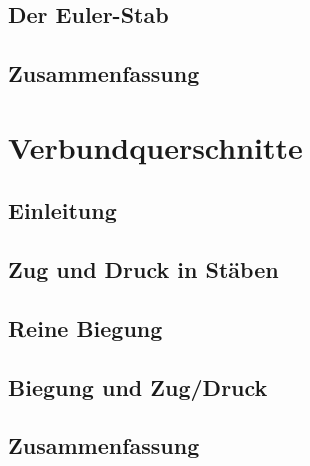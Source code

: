 \documentclass[11pt]{article}
\newcommand{\1}{ {\mathds{1}} }
\begin{document}
		\subsection{Der Euler-Stab}
		\subsection{Zusammenfassung}
	
		\section{Verbundquerschnitte}
		\subsection{Einleitung}
		\subsection{Zug und Druck in Stäben}
		\subsection{Reine Biegung}
		\subsection{Biegung und Zug/Druck}
		\subsection{Zusammenfassung}
\end{document}
